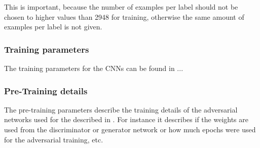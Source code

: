 This is important, because the number of examples per label should not be chosen to higher values than 2948 for training, otherwise the same amount of examples per label is not given.



\subsubsection{Training parameters}
The training parameters for the CNNs can be found in ...




\subsubsection{Pre-Training details}

The pre-training parameters describe the training details of the adversarial networks used for the  described in .
For instance it describes if the weights are used from the discriminator or generator network or how much epochs were used for the adversarial training, etc.




